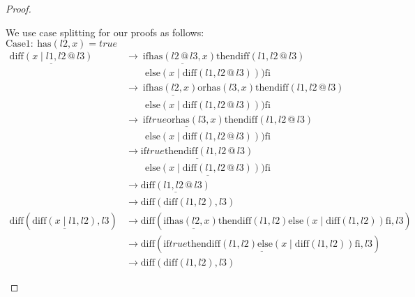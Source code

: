 \documentclass[12pt, a4paper]{article}
\newcommand{\rel}[1]{\mathrel{#1}}
\newcommand{\rmx}[1]{\mathrm{#1}}
\newcommand{\larrow}{\longrightarrow}
\newcommand{\under}{\underline}
\begin{document}
\begin{proof}
\begin{description}
We use case splitting for our proofs as follows: \\
$\rmx{Case 1:}\ \rmx{has}(l2, x) = true$
\begin{align*}
\under{\rmx{diff}(x \rel{|} l1, l2 \rel{@} l3)}
	&\larrow\ \rel{\rmx{if}} \under{\rmx{has}(l2 \rel{@} l3, x)} \rel{\rmx{then}} \rmx{diff}(l1,l2 \rel{@} l3) \\
	&\quad \quad \rel{\rmx{else}} (x \rel{|} \rmx{diff}(l1, l2 \rel{@} l3))) \rel{\rmx{fi}} \tag{by } \\
	&\larrow\ \rel{\rmx{if}} \under{\rmx{has}(l2, x)} \rel{\rmx{or}} \rmx{has}(l3, x) \rel{\rmx{then}} \rmx{diff}(l1,l2 \rel{@} l3) \\
	&\quad \quad \rel{\rmx{else}} (x \rel{|} \rmx{diff}(l1, l2 \rel{@} l3))) \rel{\rmx{fi}} \tag{by Lemma 1 from Problem 6} \\
	&\larrow\ \rel{\rmx{if}} \under{true \rel{\rmx{or}} \rmx{has}(l3, x)} \rel{\rmx{then}} \rmx{diff}(l1,l2 \rel{@} l3) \\
	&\quad \quad \rel{\rmx{else}} (x \rel{|} \rmx{diff}(l1, l2 \rel{@} l3))) \rel{\rmx{fi}} \tag{by case splitting} \\
	&\larrow \under{\rel{\rmx{if}} true \rel{\rmx{then}} \rmx{diff}(l1,l2 \rel{@} l3)} \\
	&\quad \quad \under{\rel{\rmx{else}} (x \rel{|} \rmx{diff}(l1, l2 \rel{@} l3))) \rel{\rmx{fi}}} \tag{by or} \\
	&\larrow \under{\rmx{diff}(l1,l2 \rel{@} l3)} \tag{by if1} \\
	&\larrow \rmx{diff}(\rmx{diff}(l1,l2), l3) \tag{by IH} \\
\rmx{diff}(\under{\rmx{diff}(x \rel{|} l1, l2)}, l3)
	&\larrow \rmx{diff}(\rel{\rmx{if}} \under{\rmx{has}(l2, x)} \rel{\rmx{then}} \rmx{diff}(l1, l2) \rel{\rmx{else}} (x \rel{|} \rmx{diff}(l1, l2)) \rel{\rmx{fi}}, l3) \tag{by diff2} \\
	&\larrow \rmx{diff}(\under{\rel{\rmx{if}} true \rel{\rmx{then}} \rmx{diff}(l1, l2) \rel{\rmx{else}} (x \rel{|} \rmx{diff}(l1, l2)) \rel{\rmx{fi}}}, l3) \tag{by case splitting} \\
	&\larrow \rmx{diff}(\rmx{diff}(l1, l2), l3) \tag{by if1}
\end{align*}


\end{description}
\end{proof}
\end{document}
